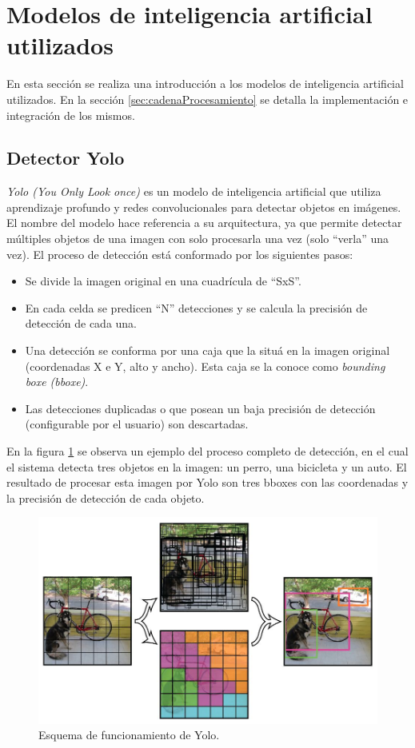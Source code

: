 \section{Modelos de inteligencia artificial utilizados}
\label{sec:modelosIA}

En esta sección se realiza una introducción a los modelos de inteligencia artificial utilizados. En la sección \ref{sec:cadenaProcesamiento} se detalla la implementación e integración de los mismos.

\subsection{Detector Yolo}

\textit{Yolo (You Only Look once)} es un modelo de inteligencia artificial que utiliza aprendizaje profundo y redes convolucionales para detectar objetos en imágenes. El nombre del modelo hace referencia a su arquitectura, ya que permite detectar múltiples objetos de una imagen con solo procesarla una vez (solo ``verla'' una vez). El proceso de detección está conformado por los siguientes pasos:

\begin{itemize}
\item Se divide la imagen original en una cuadrícula de ``SxS''.
\item En cada celda se predicen ``N'' detecciones y se calcula la precisión de detección de cada una.
\item Una detección se conforma por una caja que la situá en la imagen original (coordenadas X e Y, alto y ancho). Esta caja se la conoce como \textit{bounding boxe (bboxe)}.
\item Las detecciones duplicadas o que posean un baja precisión de detección (configurable por el usuario) son descartadas.
\end{itemize}

En la figura \ref{fig:diagramaYolo} se observa un ejemplo del proceso completo de detección, en el cual el sistema detecta tres objetos en la imagen: un perro, una bicicleta y un auto. El resultado de procesar esta imagen por Yolo son tres bboxes con las coordenadas y la precisión de detección de cada objeto.

\begin{figure}[ht]
	\centering
	\includegraphics[scale=.60]{./Figures/yolo.jpg}
	\caption{Esquema de funcionamiento de Yolo\protect\footnotemark.}
	\label{fig:diagramaYolo}
\end{figure}


